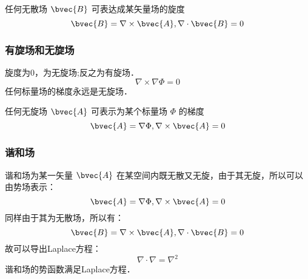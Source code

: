 任何无散场 $\bvec{B}$ 可表达成某矢量场的旋度
\begin{equation}\label{VecAnl_eq25}
\bvec{B}=\nabla\times\bvec{A} ,\nabla\cdot\bvec{B}=0
\end{equation}

\subsubsection{有旋场和无旋场}
旋度为0，为无旋场;反之为有旋场．
\begin{equation}\label{VecAnl_eq26}
\nabla\times\nabla\Phi=0
\end{equation}
任何标量场的梯度永远是无旋场．

任何无旋场 $\bvec{A}$ 可表示为某个标量场 $\Phi$ 的梯度
\begin{equation}\label{VecAnl_eq27}
\bvec{A}=\nabla\Phi,\nabla\times\bvec{A}=0
\end{equation}

\subsubsection{谐和场}
谐和场为某一矢量 $\bvec{A}$ 在某空间内既无散又无旋，由于其无旋，所以可以由势场表示：
\begin{equation}\label{VecAnl_eq28}
\bvec{A}=\nabla\Phi,\nabla\times\bvec{A}=0
\end{equation}
同样由于其为无散场，所以有：
\begin{equation}\label{VecAnl_eq29}
\bvec{B}=\nabla\times\bvec{A} ,\nabla\cdot\bvec{B}=0
\end{equation}
故可以导出Laplace方程：
\begin{equation}\label{VecAnl_eq30}
\nabla\cdot\nabla=\nabla^2
\end{equation}
谐和场的势函数满足Laplace方程．
